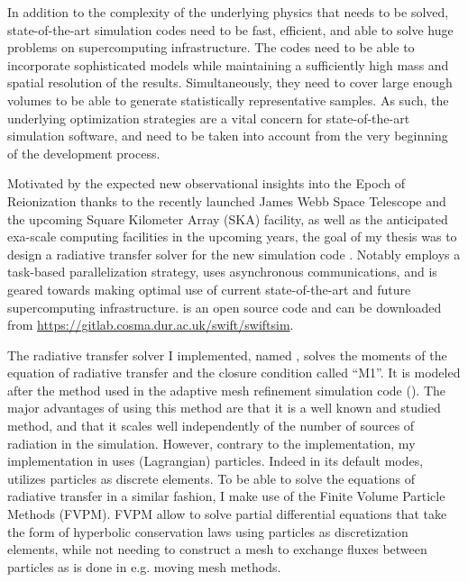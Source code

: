 

In addition to the complexity of the underlying physics that needs to be solved, state-of-the-art
simulation codes need to be fast, efficient, and able to solve huge problems on supercomputing
infrastructure. The codes need to be able to incorporate sophisticated models while maintaining a
sufficiently high mass and spatial resolution of the results. Simultaneously, they need to cover
large enough volumes to be able to generate statistically representative samples. As such, the
underlying optimization strategies are a vital concern for state-of-the-art simulation software,
and need to be taken into account from the very beginning of the development process.

Motivated by the expected new observational insights into the Epoch of Reionization thanks to the
recently launched James Webb Space Telescope and the upcoming Square Kilometer Array (SKA) facility,
as well as the anticipated exa-scale computing facilities in the upcoming years, the goal of my
thesis was to design a radiative transfer solver for the new simulation code \swift. Notably \swift
employs a task-based parallelization strategy, uses asynchronous communications, and is geared
towards making optimal use of current state-of-the-art and future supercomputing infrastructure.
\swift is an open source code and can be downloaded from
\url{https://gitlab.cosma.dur.ac.uk/swift/swiftsim}.

The radiative transfer solver I implemented, named \GEARRT, solves the moments of the equation of
radiative transfer and the closure condition called ``M1''. It is modeled after the method used in
the \ramses adaptive mesh refinement simulation code (\cite{ramses-rt13}). The major advantages of
using this method are that it is a well known and studied method, and that it scales well
independently of the number of sources of radiation in the simulation. However, contrary to the
\ramses implementation, my implementation in \swift uses (Lagrangian) particles. Indeed in its
default modes, \swift utilizes particles as discrete elements. To be able to solve the equations of
radiative transfer in a similar fashion, I make use of the Finite Volume Particle Methods (FVPM).
FVPM allow to solve partial differential equations that take the form of hyperbolic conservation
laws using particles as discretization elements, while not needing to construct a mesh to exchange
fluxes between particles as is done in e.g. moving mesh methods.

